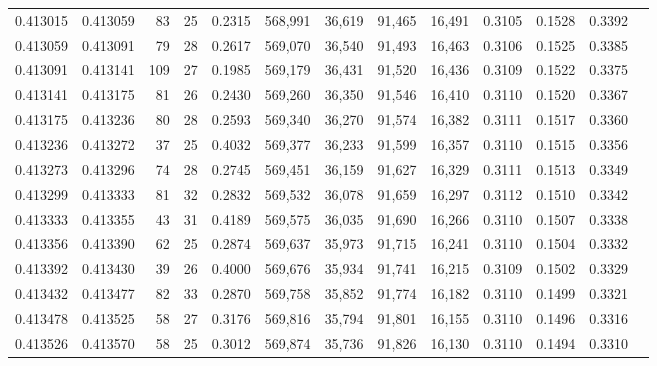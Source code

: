 \begin{tabular}{rrrrrrrrrrrrr}
0.413015 & 0.413059 &    83 &  25 &                                     0.2315 & 568,991 &  36,619 &  91,465 &  16,491 & 0.3105 & 0.1528 & 0.3392 \\
0.413059 & 0.413091 &    79 &  28 &                                     0.2617 & 569,070 &  36,540 &  91,493 &  16,463 & 0.3106 & 0.1525 & 0.3385 \\
0.413091 & 0.413141 &   109 &  27 &                                     0.1985 & 569,179 &  36,431 &  91,520 &  16,436 & 0.3109 & 0.1522 & 0.3375 \\
0.413141 & 0.413175 &    81 &  26 &                                     0.2430 & 569,260 &  36,350 &  91,546 &  16,410 & 0.3110 & 0.1520 & 0.3367 \\
0.413175 & 0.413236 &    80 &  28 &                                     0.2593 & 569,340 &  36,270 &  91,574 &  16,382 & 0.3111 & 0.1517 & 0.3360 \\
0.413236 & 0.413272 &    37 &  25 &                                     0.4032 & 569,377 &  36,233 &  91,599 &  16,357 & 0.3110 & 0.1515 & 0.3356 \\
0.413273 & 0.413296 &    74 &  28 &                                     0.2745 & 569,451 &  36,159 &  91,627 &  16,329 & 0.3111 & 0.1513 & 0.3349 \\
0.413299 & 0.413333 &    81 &  32 &                                     0.2832 & 569,532 &  36,078 &  91,659 &  16,297 & 0.3112 & 0.1510 & 0.3342 \\
0.413333 & 0.413355 &    43 &  31 &                                     0.4189 & 569,575 &  36,035 &  91,690 &  16,266 & 0.3110 & 0.1507 & 0.3338 \\
0.413356 & 0.413390 &    62 &  25 &                                     0.2874 & 569,637 &  35,973 &  91,715 &  16,241 & 0.3110 & 0.1504 & 0.3332 \\
0.413392 & 0.413430 &    39 &  26 &                                     0.4000 & 569,676 &  35,934 &  91,741 &  16,215 & 0.3109 & 0.1502 & 0.3329 \\
0.413432 & 0.413477 &    82 &  33 &                                     0.2870 & 569,758 &  35,852 &  91,774 &  16,182 & 0.3110 & 0.1499 & 0.3321 \\
0.413478 & 0.413525 &    58 &  27 &                                     0.3176 & 569,816 &  35,794 &  91,801 &  16,155 & 0.3110 & 0.1496 & 0.3316 \\
0.413526 & 0.413570 &    58 &  25 &                                     0.3012 & 569,874 &  35,736 &  91,826 &  16,130 & 0.3110 & 0.1494 & 0.3310 \\

\end{tabular}
